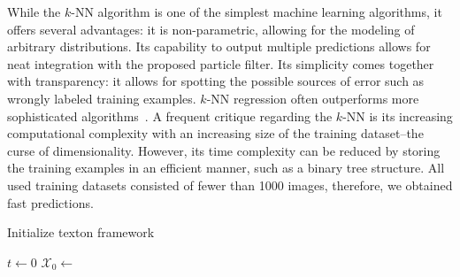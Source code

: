 \documentclass{report}
\begin{document}
While the $k$-NN algorithm is one of the simplest machine learning
algorithms, it offers several advantages: it is non-parametric,
allowing for the modeling of arbitrary distributions. Its capability
to output multiple predictions allows for neat integration with the
proposed particle filter. Its simplicity comes together with
transparency: it allows for spotting the possible sources of error
such as wrongly labeled training examples. $k$-NN regression often
outperforms more sophisticated algorithms~\cite{knn}. A frequent
critique regarding the $k$-NN is its increasing computational
complexity with an increasing size of the training dataset--the curse
of dimensionality. However, its time complexity can be reduced by
storing the training examples in an efficient manner, such as a binary
tree structure. All used training datasets consisted of fewer than
1000 images, therefore, we obtained fast predictions.

\begin{algorithm}
\caption{Initialize texton framework}
\label{alg:trexton_init}
  \begin{algorithmic}[1]
    \State $t \gets 0$ 
    \State $\mathcal{X}_0 \gets$ 
    \EndProcedure
  \end{algorithmic}
\end{algorithm}

\end{document}
